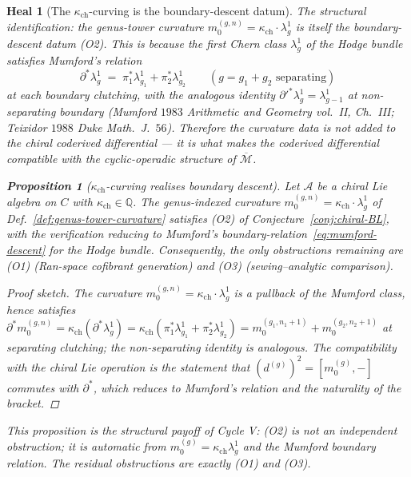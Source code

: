 \documentclass[11pt]{amsart}
\newtheorem*{heal}{Heal}
\newtheorem{proposition}[theorem]{Proposition}
\newcommand{\kch}{\kappa_{\mathrm{ch}}}
\newcommand{\cA}{\mathcal{A}}
\newcommand{\cM}{\mathcal{M}}
\newcommand{\Mbar}{\overline{\cM}}
\begin{document}
\begin{heal}[The $\kch$-curving is the boundary-descent datum]
The structural identification: the genus-tower curvature
$m_0^{(g,n)}=\kch\cdot\lambda_g^{1}$ is \emph{itself} the
boundary-descent datum (O2). This is because the first Chern class
$\lambda_g^{1}$ of the Hodge bundle satisfies Mumford's relation
\begin{equation}
\partial^*\lambda_g^{1} \;=\;
\pi_1^*\lambda_{g_1}^{1}+\pi_2^*\lambda_{g_2}^{1}
\qquad (g=g_1+g_2\text{ separating})
\label{eq:mumford-descent}
\end{equation}
at each boundary clutching, with the analogous identity
$\partial'^*\lambda_g^{1}=\lambda_{g-1}^{1}$ at non-separating boundary
(Mumford $1983$ \emph{Arithmetic and Geometry} vol.\ II, Ch.~III;
Teixidor $1988$ \emph{Duke Math.\ J.}\ $56$). Therefore the
curvature data is \emph{not added} to the chiral coderived
differential --- it \emph{is} what makes the coderived differential
compatible with the cyclic-operadic structure of $\Mbar$.
\begin{proposition}[$\kch$-curving realises boundary descent]
\label{prop:kch-curving-descent}
Let $\cA$ be a chiral Lie algebra on $C$ with
$\kch\in\mathbb{Q}$. The genus-indexed curvature
$m_0^{(g,n)}=\kch\cdot\lambda_g^{1}$ of
Def.~\ref{def:genus-tower-curvature} satisfies (O2) of
Conjecture~\ref{conj:chiral-BL}, with the verification reducing to
Mumford's boundary-relation~\eqref{eq:mumford-descent} for the Hodge
bundle. Consequently, the only obstructions remaining are (O1)
(Ran-space cofibrant generation) and (O3) (sewing--analytic
comparison).
\end{proposition}
\begin{proof}[Proof sketch]
The curvature $m_0^{(g,n)}=\kch\cdot\lambda_g^{1}$ is a pullback of
the Mumford class, hence satisfies
$\partial^* m_0^{(g,n)}=\kch(\partial^*\lambda_g^{1})=
\kch(\pi_1^*\lambda_{g_1}^{1}+\pi_2^*\lambda_{g_2}^{1})
=m_0^{(g_1,n_1+1)}+m_0^{(g_2,n_2+1)}$
at separating clutching; the non-separating identity is analogous.
The compatibility with the chiral Lie operation is the statement that
$(d^{(g)})^2=[m_0^{(g)},-]$ commutes with $\partial^*$, which reduces
to Mumford's relation and the naturality of the bracket.
\end{proof}
This proposition is the structural payoff of Cycle V: (O2) is
\emph{not} an independent obstruction; it is \emph{automatic} from
$m_0^{(g)}=\kch\lambda_g^{1}$ and the Mumford boundary relation.
The residual obstructions are exactly (O1) and (O3).
\end{heal}
\end{document}
